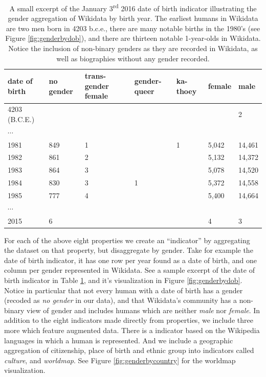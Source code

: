\documentclass{sig-alternate-05-2015}
\begin{document}
\begin{table}
\caption{A small excerpt of the January 3\textsuperscript{rd} 2016 date of birth indicator illustrating the gender aggregation of Wikidata by birth year. The earliest humans in Wikidata are two men born in 4203 b.c.e., there are many notable births in the 1980's (see Figure \ref{fig:genderbydob}), and there are thirteen notable 1-year-olds in Wikidata. Notice the inclusion of non-binary genders as they are recorded in Wikidata, as well as biographies without any gender recorded.}
\begin{tabular} {p{0.75cm}p{0.75cm}p{0.75cm}p{0.75cm}p{0.75cm}p{0.75cm}p{0.75cm}}
\toprule
date of birth & no gender & trans-gender female & gender-queer & ka-thoey & female & male \\
\midrule
4203 \small{(B.C.E.)} & & & & & & 2   \\ 
$\cdots$ &  &  &  & &  &    \\ 
1981 & 849 & 1 &  & 1 &5,042 & 14,461 \\ 
1982 & 861 & 2 &  & &5,132 & 14,372  \\ 
1983 & 864 & 3 &  & &5,078 & 14,520  \\ 
1984 & 830 & 3 & 1 & &5,372 & 14,558   \\ 
1985 & 777 & 4 &  & &5,400 & 14,664  \\ 
$\cdots$ &  &  &  & &  &    \\ 
2015 & 6 &  &  & & 4 & 3  \\ 
\bottomrule
\end{tabular}
\label{table:dob}
\end{table}

For each of the above eight properties we create an ``indicator'' by aggregating the dataset on that property, but disaggregate by gender. Take for example the date of birth indicator, it has one row per year found as a date of birth, and one column per gender represented in Wikidata. See a sample excerpt of the date of birth indicator in Table \ref{table:dob}, and it's visualization in Figure \ref{fig:genderbydob}. Notice in particular that not every human with a date of birth has a gender (recoded as \textit{no gender} in our data), and that Wikidata's community has a non-binary view of gender and includes humans which are neither \textit{male} nor \textit{female}. In addition to the eight indicators made directly from properties, we include three more which feature augmented data. There is a indicator based on the Wikipedia languages in which a human is represented. And we include a geographic aggregation of citizenship, place of birth and ethnic group into indicators called \textit{culture}, and \textit{worldmap}. See Figure \ref{fig:genderbycountry} for the worldmap visualization. 
\end{document}
